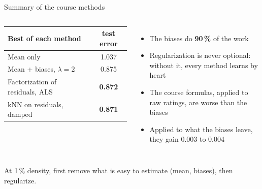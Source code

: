 \documentclass[aspectratio=169,11pt]{beamer}
\newcommand{\key}[1]{\textcolor{accent}{\textbf{#1}}}
\newcommand{\takeaway}[1]{\vfill\begin{center}\colorbox{accent!8}{\parbox{0.9\textwidth}{\centering #1}}\end{center}}
\begin{document}
\begin{frame}{Summary of the course methods}
\begin{columns}[c]
\footnotesize
\begin{tabular}{@{}lc@{}}
\toprule
\textbf{Best of each method} & \textbf{test error} \\
\midrule
Mean only & 1.037 \\
Mean + biases, $\lambda = 2$ & 0.875 \\
Factorization of residuals, ALS & \key{0.872} \\
kNN on residuals, damped & \key{0.871} \\
\bottomrule
\end{tabular}
\begin{itemize}\small
  \item The biases do \key{90\,\%} of the work
  \item Regularization is never optional: without it, every method learns by heart
  \item The course formulas, applied to raw ratings, are worse than the biases
  \item Applied to what the biases leave, they gain 0.003 to 0.004
\end{itemize}
\end{columns}
\takeaway{At 1\,\% density, first remove what is easy to estimate (mean, biases), then regularize.}
\end{frame}
\end{document}
